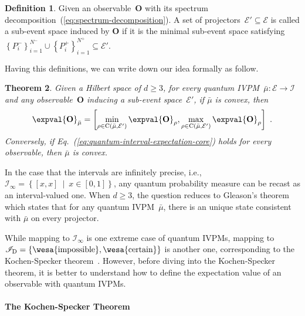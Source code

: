 \documentclass[english,reprint, aps, prl,superscriptaddress, showpacs,
showkeys, longbibliography, amsmath, amssymb]{revtex4-1}
\theoremstyle{plain}
\newtheorem{thm}{Theorem}
\theoremstyle{definition}
\newtheorem{definition}[thm]{Definition}
\newcommand{\events}{\ensuremath{\mathcal{E}}}
\newcommand{\imposs}{{\text{\wesa{impossible}}}}
\newcommand{\necess}{{\text{\wesa{certain}}}}
\newcommand{\set}[2]{\ensuremath{\left\{ {#1}~\middle|~{#2}\right\} }}
\newcommand{\coreBorn}{\ensuremath{\mathrm{C}}}
\begin{document}
\begin{definition}
Given an observable~$\mathbf{O}$ with its spectrum decomposition~(\ref{eq:spectrum-decomposition}).
A set of projectors~$\events'\subseteq\events$ is called a sub-event
space induced by $\mathbf{O}$ if it is the minimal sub-event space
satisfying $\left\{ P_{i}^{-}\right\} _{i=1}^{N^{-}}\cup\left\{ P_{i}^{+}\right\} _{i=1}^{N^{+}}\subseteq\events'$.
\end{definition}

\noindent Having this definitions, we can write down our idea formally
as follow.

\begin{thm}
Given a Hilbert space of $d\ge3$, for every quantum IVPM~$\bar{\mu}:\events\rightarrow\mathscr{I}$
and any observable~$\mathbf{O}$ inducing a sub-event space~$\events'$,
if $\bar{\mu}$ is convex, then
\begin{equation}
\expval{\mathbf{O}}_{\bar{\mu}}=\left[\min_{\rho\in\coreBorn\left(\bar{\mu},\events'\right)}\expval{\mathbf{O}}_{\rho},\max_{\rho\in\coreBorn\left(\bar{\mu},\events'\right)}\expval{\mathbf{O}}_{\rho}\right]\textrm{ .}\label{eq:quantum-interval-expectation-core}
\end{equation}
Conversely, if Eq.~(\ref{eq:quantum-interval-expectation-core})
holds for every observable, then $\bar{\mu}$ is convex.
\end{thm}

\newpage{}

In the case that the intervals are infinitely precise, i.e., $\mathscr{I}_{\infty}=\set{\left[x,x\right]}{x\in\left[0,1\right]}$,
any quantum probability measure can be recast as an interval-valued
one. When $d\ge3$, the question reduces to Gleason's theorem which
states that for any quantum IVPM~$\bar{\mu}$, there is an unique
state consistent with $\bar{\mu}$ on every projector.

While mapping to $\mathscr{I}_{\infty}$ is one extreme case of quantum
IVPMs, mapping to $\mathscr{I}_{\mathrm{D}}=\left\{ \imposs,\necess\right\} $
is another one, corresponding to the Kochen-Specker theorem~\cite{kochenspecker1967,peres1995quantum,Redhead1987-REDINA,Griffiths2003}.
However, before diving into the Kochen-Specker theorem, it is better
to understand how to define the expectation value of an observable
with quantum IVPMs.

\paragraph{The Kochen-Specker Theorem}
\end{document}
